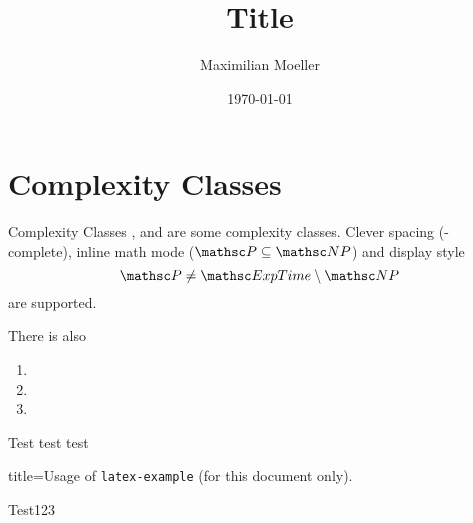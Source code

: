 \documentclass[aspectratio=1610]{beamer}
\author{Maximilian Moeller}
\title{Title}
\date{\today}
\begin{document}
\maketitle


\section{Complexity Classes}

\begin{frame}{Complexity Classes}
\PTime, \NP and  are some complexity classes.
Clever spacing (\NP-complete),
inline math mode ($\PTime \subseteq \NP$)
and display style
\[
	\PTime \neq \ExpTime \setminus \NP
\]
are supported.

There is also
\begin{enumerate}
	\item \kExpTime
	\item \NkExpTime 
	\item \kExpTime[4]
\end{enumerate}
\end{frame}

\begin{frame}
	\lipsum[1]

	Test test test
\end{frame}

\begin{frame}[fragile]
\begin{tcblisting}{title=Usage of \texttt{latex-example} (for this document only).}
	\begin{latex-example}[lefthand width=3.5cm]{Test123}
	\end{latex-example}
\end{tcblisting}
\end{frame}
\end{document}
